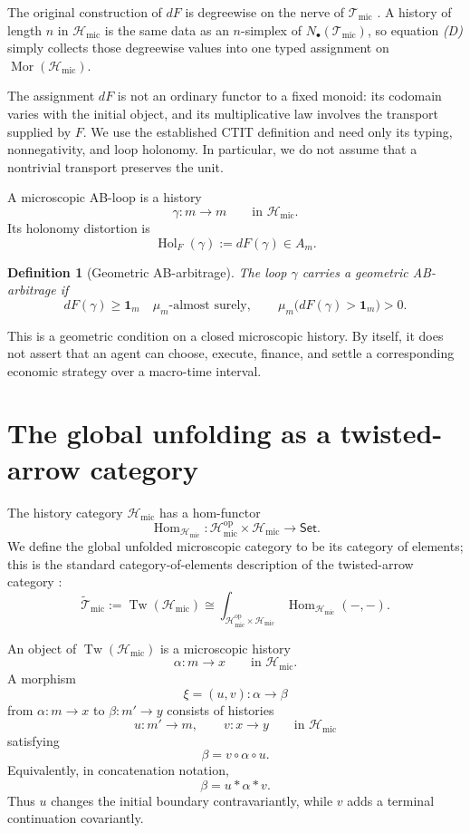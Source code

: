 \documentclass[11pt,a4paper]{article}
\newtheorem{definition}{Definition}[section]
\newcommand{\Tw}{\operatorname{Tw}}
\newcommand{\Hol}{\operatorname{Hol}}
\newcommand{\Tmic}{\mathcal T_{\mathrm{mic}}}
\newcommand{\Hmic}{\mathcal H_{\mathrm{mic}}}
\begin{document}
The original construction of \(dF\) is degreewise on the nerve of \(\Tmic\)
\cite{AdachiHaraAB}.
A history of length \(n\) in \(\Hmic\) is the same data as an
\(n\)-simplex of \(N_\bullet(\Tmic)\), so equation \emph{(D)} simply collects
those degreewise values into one typed assignment on
\(\operatorname{Mor}(\Hmic)\). 

The assignment \(dF\) is not an ordinary functor to a fixed monoid: its
codomain varies with the initial object, and its multiplicative law involves
the transport supplied by \(F\). We use the established CTIT definition and
need only its typing, nonnegativity, and loop holonomy. In particular, we do
not assume that a nontrivial transport preserves the unit.

A microscopic AB-loop is a history
\[
  \gamma:m\longrightarrow m
  \qquad\text{in }\Hmic.
\]
Its holonomy distortion is
\[
  \Hol_F(\gamma):=dF(\gamma)\in A_m.
\]

\begin{definition}[Geometric AB-arbitrage]
The loop \(\gamma\) carries a geometric AB-arbitrage if
\[
  dF(\gamma)\geq\mathbf1_m
  \quad\mu_m\text{-almost surely},
  \qquad
  \mu_m\bigl(dF(\gamma)>\mathbf1_m\bigr)>0.
\]
\end{definition}

This is a geometric condition on a closed microscopic history. By itself, it
does not assert that an agent can choose, execute, finance, and settle a
corresponding economic strategy over a macro-time interval.


\section{The global unfolding as a twisted-arrow category}
\label{sec:globalUnfolding}

The history category \(\Hmic\) has a hom-functor
\[
  \operatorname{Hom}_{\Hmic}:
  \Hmic^{\mathrm{op}}\times\Hmic
  \longrightarrow\mathsf{Set}.
\]
We define the global unfolded microscopic category to be its category of
elements; this is the standard category-of-elements description of the
twisted-arrow category \cite[Tag 03JC]{Kerodon}:
\[
  \widetilde{\mathcal T}_{\mathrm{mic}}
  :=
  \Tw(\Hmic)
  \cong
  \int_{\Hmic^{\mathrm{op}}\times\Hmic}
  \operatorname{Hom}_{\Hmic}(-,-).
  \tag{TW}
\]

An object of \(\Tw(\Hmic)\) is a microscopic history
\[
  \alpha:m\longrightarrow x
  \qquad\text{in }\Hmic.
\]
A morphism
\[
  \xi=(u,v):\alpha\longrightarrow\beta
\]
from \(\alpha:m\to x\) to \(\beta:m'\to y\) consists of histories
\[
  u:m'\longrightarrow m,
  \qquad
  v:x\longrightarrow y
  \qquad\text{in }\Hmic
\]
satisfying
\[
  \beta=v\circ\alpha\circ u.
  \tag{F}
\]
Equivalently, in concatenation notation,
\[
  \beta=u*\alpha*v.
\]
Thus \(u\) changes the initial boundary contravariantly, while \(v\) adds a
terminal continuation covariantly.
\end{document}
